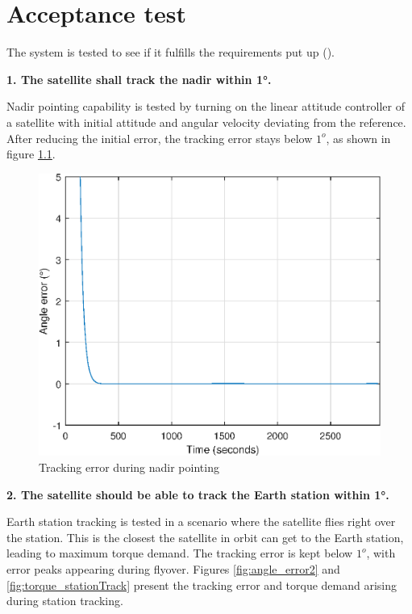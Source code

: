 \chapter{Acceptance test} \label{chap:acceptanceTest}

The system is tested to see if it fulfills the requirements put up ().

\textbf{1. The satellite shall track the nadir within 1°.}

Nadir pointing capability is tested by turning on the linear attitude controller of a satellite with initial attitude and angular velocity deviating from the reference. After reducing the initial error, the tracking error stays below $1^o$, as shown in figure \ref{fig:angle_error}.

\begin{figure}[H]
	\centering
	\includegraphics[width=0.7\linewidth]{figures/angle_error}
	\caption{Tracking error during nadir pointing}
	\label{fig:angle_error}
\end{figure}

\textbf{2. The satellite should be able to track the Earth station within 1°.	}

Earth station tracking is tested in a scenario where the satellite flies right over the station. This is the closest the satellite in orbit can get to the Earth station, leading to maximum torque demand. The tracking error is kept below  $1^o$, with error peaks appearing during flyover. Figures \ref{fig:angle_error2} and \ref{fig:torque_stationTrack} present the tracking error and torque demand arising during station tracking.

